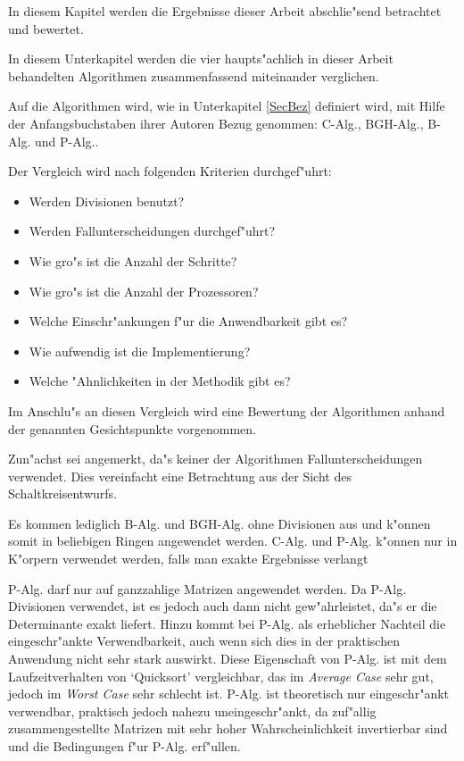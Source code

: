 %
%
\label{ChapEndbem}

In diesem Kapitel werden die Ergebnisse dieser Arbeit abschlie"send 
betrachtet und bewertet.


In diesem Unterkapitel werden die vier haupts"achlich in dieser Arbeit 
behandelten Algorithmen zusammenfassend miteinander verglichen.

Auf die Algorithmen wird, wie in Unterkapitel \ref{SecBez} definiert 
wird, mit Hilfe der Anfangsbuchstaben ihrer Autoren
Bezug genommen: C-Alg., BGH-Alg., B-Alg. und P-Alg..

Der Vergleich wird nach folgenden Kriterien durchgef"uhrt:
\begin{itemize}
\item
      Werden Divisionen benutzt?
\item
      Werden Fallunterscheidungen durchgef"uhrt?
\item
      Wie gro"s ist die Anzahl der Schritte?
\item
      Wie gro"s ist die Anzahl der Prozessoren?
\item
      Welche Einschr"ankungen f"ur die Anwendbarkeit gibt es?
\item
      Wie aufwendig ist die Implementierung?
\item
      Welche "Ahnlichkeiten in der Methodik gibt es? 
\end{itemize}
Im Anschlu"s an diesen Vergleich wird eine Bewertung der Algorithmen 
anhand der genannten Gesichtspunkte vorgenommen.

Zun"achst sei angemerkt, da"s keiner der Algorithmen Fallunterscheidungen
verwendet. Dies vereinfacht eine Betrachtung aus der Sicht des 
Schaltkreisentwurfs.

Es kommen lediglich B-Alg. und BGH-Alg. ohne Divisionen aus und k"onnen 
somit in beliebigen Ringen angewendet werden. C-Alg. und P-Alg. k"onnen nur
in K"orpern verwendet werden, falls man exakte Ergebnisse verlangt

P-Alg. darf nur auf ganzzahlige Matrizen
angewendet werden. Da P-Alg. Divisionen verwendet, ist es jedoch auch dann
nicht gew"ahrleistet, da"s er die Determinante exakt liefert. Hinzu kommt
bei P-Alg. als erheblicher Nachteil die eingeschr"ankte Verwendbarkeit, auch 
wenn sich dies in der praktischen Anwendung nicht sehr stark auswirkt. 
Diese Eigenschaft von P-Alg. ist mit dem Laufzeitverhalten von `Quicksort'
vergleichbar, das im {\em Average Case} sehr gut, jedoch im {\em Worst 
Case} sehr schlecht ist. P-Alg. ist theoretisch nur eingeschr"ankt 
verwendbar, praktisch jedoch nahezu uneingeschr"ankt, da zuf"allig
zusammengestellte Matrizen mit sehr hoher Wahrscheinlichkeit invertierbar
sind und die Bedingungen f"ur P-Alg. erf"ullen.

